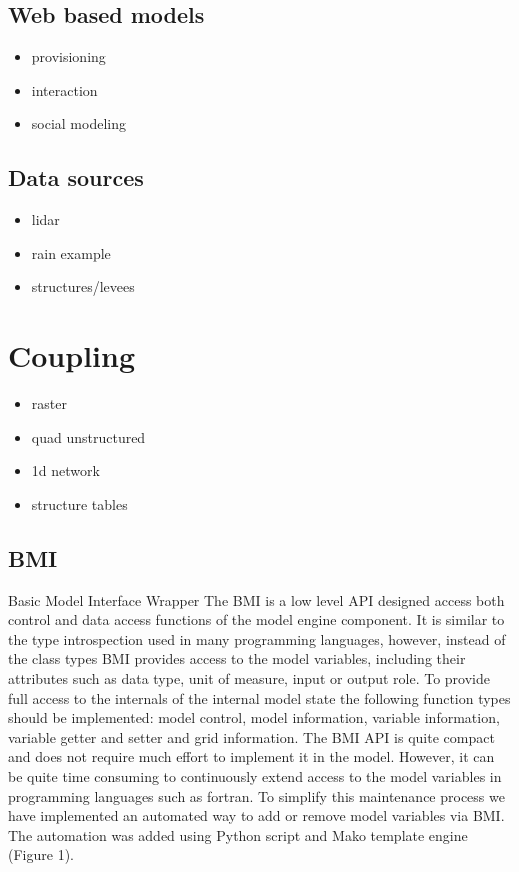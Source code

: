 \documentclass[a4paper]{article}
\begin{document}
\subsection{Web based models }
\begin{itemize}
  \item provisioning
  \item interaction
  \item social modeling
\end{itemize}
\subsection{Data sources }
\begin{itemize}
  \item lidar
  \item rain example
  \item structures/levees
\end{itemize}

\section{Coupling}
\label{sec:coupling}

\begin{itemize}
  \item raster
  \item quad unstructured
  \item 1d network
  \item structure tables
\end{itemize}

\subsection{BMI}

Basic Model Interface Wrapper
The \ac{BMI} is a low level API designed access both control and data access functions of the model engine component. It is similar to the type introspection used in many programming languages, however, instead of the class types \ac{BMI} provides access to the model variables, including their attributes such as data type, unit of measure, input or output role. To provide full access to the internals of the internal model state the following function types should be implemented: model control, model information, variable information, variable getter and setter and grid information. The \ac{BMI} API is quite compact and does not require much effort to implement it in the model. However, it can be quite time consuming to continuously extend access to the model variables in programming languages such as fortran. To simplify this maintenance process we have implemented an automated way to add or remove model variables via \ac{BMI}. The automation was added using Python script and Mako template engine (Figure 1).
\end{document}
